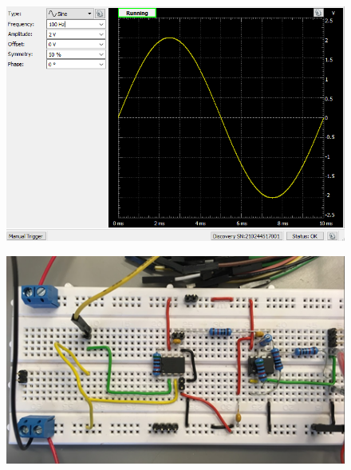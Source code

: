 \begin{figure}[H]
\centering
\begin{minipage}{.5\textwidth}
  \centering
  \includegraphics[width=.9\linewidth]{Figure/VCCSwavegen1}
  \label{fig:test1}
\end{minipage}%
\begin{minipage}{.5\textwidth}
  \centering
  \includegraphics[width=.9\linewidth]{Figure/oprindeligekredslob}
  \label{fig:test2}
\end{minipage}
\end{figure}



